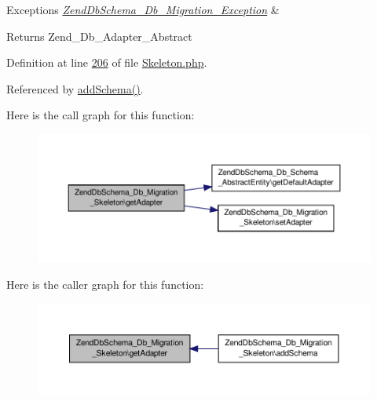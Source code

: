 \begin{DoxyExceptions}{Exceptions}
{\em \hyperlink{classZendDbSchema__Db__Migration__Exception}{Zend\-Db\-Schema\-\_\-\-Db\-\_\-\-Migration\-\_\-\-Exception}} & \\
\hline
\end{DoxyExceptions}
\begin{DoxyReturn}{Returns}
Zend\-\_\-\-Db\-\_\-\-Adapter\-\_\-\-Abstract 
\end{DoxyReturn}


Definition at line \hyperlink{Skeleton_8php_source_l00206}{206} of file \hyperlink{Skeleton_8php_source}{Skeleton.\-php}.



Referenced by \hyperlink{Skeleton_8php_source_l00093}{add\-Schema()}.



Here is the call graph for this function\-:\nopagebreak
\begin{figure}[H]
\begin{center}
\leavevmode
\includegraphics[width=350pt]{classZendDbSchema__Db__Migration__Skeleton_a1d08bca816aaff3ac27087d5e5daa2ff_cgraph}
\end{center}
\end{figure}




Here is the caller graph for this function\-:\nopagebreak
\begin{figure}[H]
\begin{center}
\leavevmode
\includegraphics[width=350pt]{classZendDbSchema__Db__Migration__Skeleton_a1d08bca816aaff3ac27087d5e5daa2ff_icgraph}
\end{center}
\end{figure}


